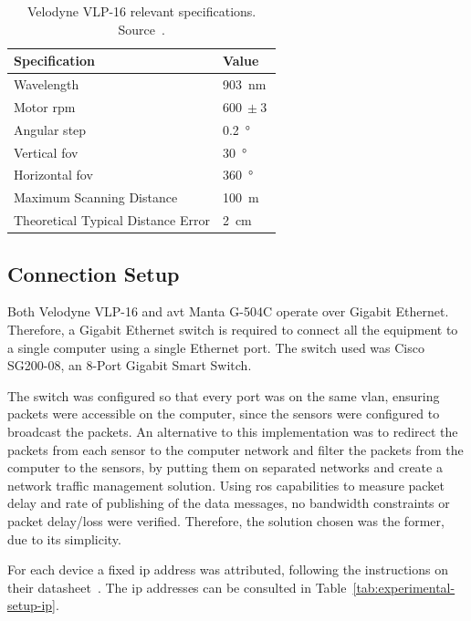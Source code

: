 \begin{table}[!ht]
	\renewcommand{\arraystretch}{1.2}
	\centering
	\begin{tabular}{@{}p{8.3cm}l@{}}
		\toprule
		Specification & Value \\ \midrule
		Wavelength    & \SI{903}{\nano\meter} \\
		Motor \acs{rpm} & $\SI{600}{} \pm \SI{3}{}$ \\
		Angular step & \SI{0.2}{\degree} \\
		Vertical \ac{fov} & \SI{30}{\degree} \\
		Horizontal \ac{fov} & \SI{360}{\degree} \\
		Maximum Scanning Distance & \SI{100}{\meter} \\
		Theoretical Typical Distance Error & \SI{2}{\centi\meter} \\
		\bottomrule
	\end{tabular}
	\caption[Velodyne\cp~VLP-16 relevant\texttrademark relevant specifications.]{Velodyne VLP-16 relevant specifications. Source~\cite{VLP16}.}
	\label{tab:vlp16-specs}
\end{table}


\subsection{Connection Setup} 
Both Velodyne VLP-16 and \ac{avt} Manta G-504C operate over Gigabit Ethernet. Therefore, a Gigabit  Ethernet switch is required to connect all the equipment to a single computer using a single Ethernet port. The switch used was Cisco SG200-08, an 8-Port Gigabit Smart Switch. 

The switch was configured so that every port was on the same \ac{vlan}, ensuring packets were accessible on the computer, since the sensors were configured to broadcast the packets. An alternative to this implementation was to redirect the packets from each sensor to the computer network and filter the packets from the computer to the sensors, by putting them on separated networks and create a network traffic management solution. Using \ac{ros} capabilities to measure packet delay and rate of publishing of the data messages, no bandwidth constraints or packet delay/loss were verified. Therefore, the solution chosen was the former, due to its simplicity. 

For each device a fixed \acf{ip} address was attributed, following the instructions on their datasheet~\cite{VLP16, MantaVision2013}. The \ac{ip} addresses can be consulted in Table~\ref{tab:experimental-setup-ip}.

